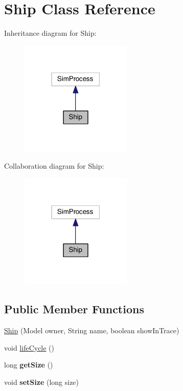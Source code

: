 \hypertarget{class_ship}{\section{Ship Class Reference}
\label{class_ship}
}


Inheritance diagram for Ship\-:
\nopagebreak
\begin{figure}[H]
\begin{center}
\leavevmode
\includegraphics[width=150pt]{class_ship__inherit__graph}
\end{center}
\end{figure}


Collaboration diagram for Ship\-:
\nopagebreak
\begin{figure}[H]
\begin{center}
\leavevmode
\includegraphics[width=150pt]{class_ship__coll__graph}
\end{center}
\end{figure}
\subsection*{Public Member Functions}
\begin{DoxyCompactItemize}
\item 
\hyperlink{class_ship_a8f3b6e601c7487a18699452dbdcf163c}{Ship} (Model owner, String name, boolean show\-In\-Trace)
\item 
void \hyperlink{class_ship_a553ad1866574241a0d48d80cbdb7cf21}{life\-Cycle} ()
\item 
\hypertarget{class_ship_aa5737462293bc6bca114882f482c1035}{long {\bfseries get\-Size} ()}\label{class_ship_aa5737462293bc6bca114882f482c1035}

\item 
\hypertarget{class_ship_a47761d9181d312d7153daef880566497}{void {\bfseries set\-Size} (long size)}\label{class_ship_a47761d9181d312d7153daef880566497}

\end{DoxyCompactItemize}


